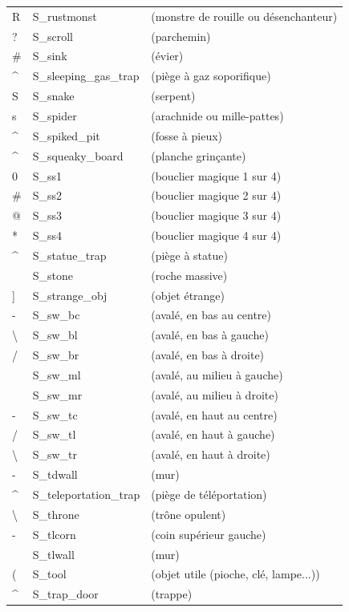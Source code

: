 \documentclass[titlepage]{article}
\begin{document}
\begin{longtable}{lll}
R & S\_rustmonst & (monstre de rouille ou désenchanteur)\\
? & S\_scroll & (parchemin)\\
\# & S\_sink & (évier)\\
\textasciicircum{} & S\_sleeping\_gas\_trap & (piège à gaz soporifique)\\
S & S\_snake & (serpent)\\
s & S\_spider & (arachnide ou mille-pattes)\\
\textasciicircum{} & S\_spiked\_pit & (fosse à pieux)\\
\textasciicircum{} & S\_squeaky\_board & (planche grinçante)\\
0 & S\_ss1 & (bouclier magique 1 sur 4)\\
\# & S\_ss2 & (bouclier magique 2 sur 4)\\
@ & S\_ss3 & (bouclier magique 3 sur 4)\\
* & S\_ss4 & (bouclier magique 4 sur 4)\\
\textasciicircum{} & S\_statue\_trap & (piège à statue)\\
~ & S\_stone & (roche massive)\\
] & S\_strange\_obj & (objet étrange)\\
- & S\_sw\_bc & (avalé, en bas au centre)\\
\textbackslash{} & S\_sw\_bl & (avalé, en bas à gauche)\\
/ & S\_sw\_br & (avalé, en bas à droite)\\
\textbar{} & S\_sw\_ml & (avalé, au milieu à gauche)\\
\textbar{} & S\_sw\_mr & (avalé, au milieu à droite)\\
- & S\_sw\_tc & (avalé, en haut au centre)\\
/ & S\_sw\_tl & (avalé, en haut à gauche)\\
\textbackslash{} & S\_sw\_tr & (avalé, en haut à droite)\\
- & S\_tdwall & (mur)\\
\textasciicircum{} & S\_teleportation\_trap & (piège de téléportation)\\
\textbackslash{} & S\_throne & (trône opulent)\\
- & S\_tlcorn & (coin supérieur gauche)\\
\textbar{} & S\_tlwall & (mur)\\
( & S\_tool & (objet utile (pioche, clé, lampe...))\\
\textasciicircum{} & S\_trap\_door & (trappe)\\

\end{longtable}
\end{document}
